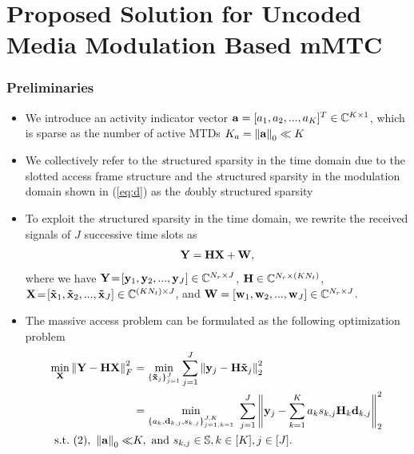 \documentclass[9pt]{beamer}
\let \it = \textit
\begin{document}
\section{Proposed Solution for Uncoded Media Modulation Based mMTC}
\begin{frame}
\frametitle{Preliminaries}
\begin{itemize}
\item
We introduce an activity indicator vector ${\bf a}=[a_1,a_2,...,a_K]^T\in\mathbb{C}^{K \times 1}$, which is sparse as the number of active MTDs $K_a=\left\|{{\bf a}}\right\|_0\ll K$
\item
We collectively refer to the {\it structured sparsity in the time domain} due to the slotted access frame structure and the {\it structured sparsity in the modulation domain} shown in (\ref{eq:d}) as the {\it doubly structured sparsity}
\item
To exploit the {\it structured sparsity in the time domain}, we rewrite the received signals of $J$ successive time slots as
\begin{equation}\label{eq:systemModel}
\begin{array}{l}
\bf{Y}=\bf{ H}\bf{X}+\bf{W},
\end{array}
\end{equation}
where we have ${\bf{Y}}\!=\![{\bf {y}}_{1}, {\bf {y}}_{2}, ..., {\bf {y}}_{J}]\in\mathbb{C}^{N_r \times J}$, ${{\bf{H}}}\in\mathbb{C}^{N_r \times (K N_t)}$, ${\bf{X}}\!=\![{{ {{\bf\tilde{x}}_{1}}}}, {{ {{\bf\tilde{x}}_{2}}}}, ..., {{{\bf \tilde {x}}_{J}}}]\in\mathbb{C}^{(K N_t) \times J}$,
and ${\bf{W}}=[{{ {{\bf{w}}_{1}}}}, {{ {{\bf{w}}_{2}}}}, ..., {{{\bf {w}}_{J}}}]\in\mathbb{C}^{N_r \times J}$.
\item
The massive access problem can be formulated as the following optimization problem
\begin{equation}\label{eq:OPTproblem}
\begin{split}
\min\limits_{\bf X} \left\|{ {\bf Y}-{\bf HX}}\right\|_F^2&=\min\limits_{\{{\bf \tilde x}_{j}\}_{j=1}^{J}}\sum\limits_{j=1}^J\left\|{ {\bf y}_j-{\bf  H}{\bf \tilde x}_j}\right\|_2^2\\
&=\min\limits_{\{a_k,{\bf d}_{k,j},s_{k,j}\}_{j=1,k=1}^{J,K}} \,\, \sum\limits_{j=1}^J\left\|{ {\bf y}_j-\sum\limits_{k = 1}^K a_k s_{k,j} {\bf H}_k{\bf d}_{k,j}}\right\|_2^2\\
{\rm s.t.}~(2),~\left\|{\bf a}\right\|_0\ll &K,~{\rm and}~s_{k,j}\in\mathbb{S}, k\in[K],j\in[J].
\end{split}
\end{equation}
\end{itemize}
\end{frame}
\end{document}
